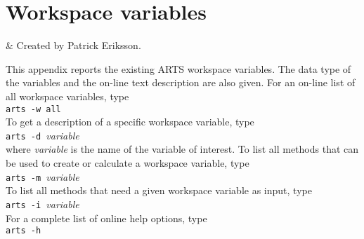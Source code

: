 \chapter{Workspace variables}


 & Created by Patrick Eriksson. \\
\stophistory

 This appendix reports the existing ARTS workspace variables. The
 data type of the variables and the on-line text description are also
 given. For an on-line list of all workspace variables, type\\

 \verb|arts -w all| \\

 \noindent
 To get a description of a specific workspace variable, type\\

 \verb|arts -d |{\it variable} \\

 \noindent
 where {\it variable} is the name of the variable of interest. To list
 all methods that can be used to create or calculate a workspace variable,
 type \\

 \verb|arts -m |{\it variable} \\

 \noindent
 To list all methods that need a given workspace variable as input,
 type \\

 \verb|arts -i |{\it variable} \\

 \noindent
 For a complete list of online help options, type\\ 

 \verb|arts -h| \\
 
 {\footnotesize
  }



